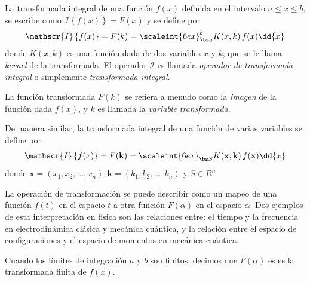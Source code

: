 La transformada integral de una función $f (x)$ definida en el intervalo $a \leq x \leq b$, se escribe como $\mathscr{I} \left\{ f (x) \right\} = F (x)$ y se define por
\begin{align}
\mathscr{I} \left\{ f (x) \right\} = F (k) = \scaleint{6ex}_{\bs a}^{b} K (x, k) \, f (x) \dd{x}
\label{eq:ecuacion_01_02_01}
\end{align}
donde $K (x, k)$ es una función dada de dos variables $x$ y $k$, que se le llama \emph{kernel} de la transformada. El operador $\mathscr{I}$ es llamada \emph{operador de transformada integral} o simplemente \emph{transformada integral}.
\par
La función transformada $F (k)$ se refiera a menudo como la \emph{imagen} de la función dada $f (x)$, y $k$ es llamada la \emph{variable transformada}.
\par
De manera similar, la transformada integral de una función de varias variables se define por
\begin{align}
\mathscr{I} \left\{ f (x) \right\} = F(\mathbf{k}) = \scaleint{6ex}_{\bs S} K (\mathbf{x}, \mathbf{k}) \, f (\mathbf{x}) \dd{x}
\label{eq:ecuacion_01_02_02}
\end{align}
donde $\mathbf{x} = (x_{1}, x_{2}, \ldots, x_{n}), \mathbf{k} = (k_{1}, k_{2}, \ldots, k_{n})$ y $S \in R^{n}$
\par
La operación de transformación se puede describir como un mapeo de una función $f (t)$ en el espacio-$t$ a otra función $F (\alpha)$ en el espacio-$\alpha$. Dos ejemplos de esta interpretación en física son las relaciones entre: el tiempo y la frecuencia en electrodinámica clásica y mecánica cuántica, y la relación entre el espacio de configuraciones y el espacio de momentos en mecánica cuántica.
\par
Cuando los límites de integración $a$ y $b$ son finitos, decimos que $F (\alpha)$ es es la transformada finita de $f (x)$. 

